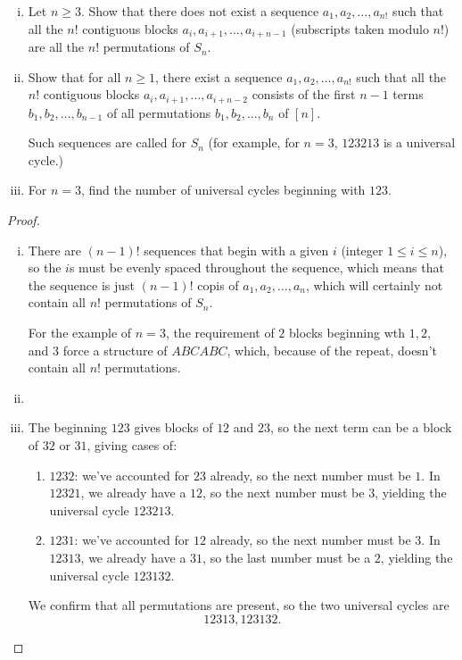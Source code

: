 \documentclass[11pt]{article}
\begin{document}
\begin{quest}[\textcolor{red}{Universal cycles for $S_n$}]
    \begin{enumerate}[(i)]
        \item Let $n\geq 3$. Show that there does not exist a sequence $a_1,a_2,\dots,a_{n!}$ such that all the $n!$ contiguous blocks $a_{i},a_{i+1},\dots,a_{i+n-1}$ (subscripts taken modulo $n!$) are all the $n!$ permutations of $S_n$.
        \item Show that for all $n\geq 1$, there exist a sequence $a_1,a_2,\dots,a_{n!}$ such that all the $n!$ contiguous blocks $a_{i},a_{i+1},\dots,a_{i+n-2}$ consists of the first $n-1$ terms $b_1,b_2,\dots,b_{n-1}$ of all permutations $b_1,b_2,\dots,b_n$ of $[n]$. 
        
        Such sequences are called  for $S_n$ (for example, for $n=3$, $123213$ is a universal cycle.)
        \item For $n=3$, find the number of universal cycles beginning with $123$.
    \end{enumerate}
\end{quest}
\begin{proof}
    \begin{enumerate}[(i)]
        \item There are $(n-1)!$ sequences that begin with a given $i$ (integer $1\leq i\leq n$), so the $i$s must be evenly spaced throughout the sequence, which means that the sequence is just $(n-1)!$ copis of $a_1,a_2,\dots,a_n$, which will certainly not contain all $n!$ permutations of $S_n$.
        
        For the example of $n=3$, the requirement of $2$ blocks beginning wth $1,2,$ and $3$ force a structure of $ABCABC$, which, because of the repeat, doesn't contain all $n!$ permutations. 
        \item %
        \item The beginning $123$ gives blocks of $12$ and $23$, so the next term can be a block of $32$ or $31$, giving cases of:
        \begin{enumerate}
            \item $1232$: we've accounted for $23$ already, so the next number must be $1$. In $12321$, we already have a $12$, so the next number must be $3$, yielding the universal cycle $123213$.
            \item $1231$: we've accounted for $12$ already, so the next number must be $3$. In $12313$, we already have a $31$, so the last number must be a $2$, yielding the universal cycle $123132$.
        \end{enumerate}
        We confirm that all permutations are present, so the two universal cycles are \[\boxed{12313,123132}.\]
    \end{enumerate}
\end{proof}
\end{document}
